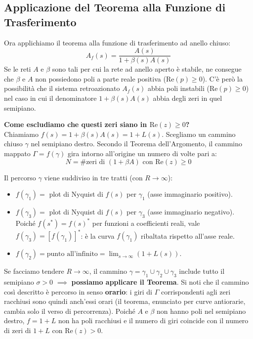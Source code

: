 \subsection{Applicazione del Teorema alla Funzione di Trasferimento}

Ora applichiamo il teorema alla funzione di trasferimento ad anello chiuso:
\[
    A_f(s) = \frac{A(s)}{1 + \beta(s)A(s)}
\]
Se le reti $A$ e $\beta$ sono tali per cui la rete ad anello aperto è stabile, ne consegue che $\beta$ e $A$ non possiedono poli a parte reale positiva ($\text{Re}(p) \ge 0$). C'è però la possibilità che il sistema retroazionato $A_f(s)$ abbia poli instabili ($\text{Re}(p) \ge 0$) nel caso in cui il denominatore $1 + \beta(s)A(s)$ abbia degli zeri in quel semipiano.

\begin{note}
\textbf{Come escludiamo che questi zeri siano in $\text{Re}(z) \ge 0$?} \\
Chiamiamo $f(s) = 1 + \beta(s)A(s) = 1 + L(s)$. Scegliamo un cammino chiuso $\gamma$ nel semipiano destro.
Secondo il Teorema dell'Argomento, il cammino mappato $\Gamma = f(\gamma)$ gira intorno all'origine un numero di volte pari a:
\[
    N = \# \text{zeri di } (1+\beta A) \text{ con } \text{Re}(z) \ge 0
\]
\end{note}

Il percorso $\gamma$ viene suddiviso in tre tratti (con $R \to \infty$):
\begin{itemize}[label=\textcolor{noteblue}{$\blacktriangleright$}]
    \item $f(\gamma_1) =$ plot di Nyquist di $f(s)$ per $\gamma_1$ (asse immaginario positivo).
    \item $f(\gamma_3) =$ plot di Nyquist di $f(s)$ per $\gamma_3$ (asse immaginario negativo). Poiché $f(s^*) = f(s)^*$ per funzioni a coefficienti reali, vale $f(\gamma_3) = [f(\gamma_1)]^*$: è la curva $f(\gamma_1)$ ribaltata rispetto all'asse reale.
    \item $f(\gamma_2) = \text{punto all'infinito} = \lim_{s \to \infty} (1+L(s))$.
\end{itemize}

Se facciamo tendere $R \to \infty$, il cammino $\gamma = \gamma_1 \cup \gamma_2 \cup \gamma_3$ include tutto il semipiano $\sigma > 0$ $\implies$ \textbf{possiamo applicare il Teorema}. Si noti che il cammino così descritto è percorso in senso \textbf{orario}: i giri di $\Gamma$ corrispondenti agli zeri racchiusi sono quindi anch'essi orari (il teorema, enunciato per curve antiorarie, cambia solo il verso di percorrenza). Poiché $A$ e $\beta$ non hanno poli nel semipiano destro, $f = 1+L$ non ha poli racchiusi e il numero di giri coincide con il numero di zeri di $1+L$ con $\text{Re}(z)>0$.

